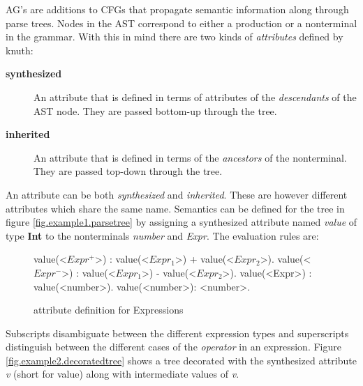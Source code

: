 AG's are additions to CFGs that propagate semantic information along through parse trees. Nodes in the AST correspond to either a production or a nonterminal in the grammar. With this in mind there are two kinds of \emph{attributes} defined by knuth\cite{knuth1}:
\begin{description}
\item[\textbf{synthesized}] An attribute that is defined in terms of attributes of the \emph{descendants} of the AST node. They are passed bottom-up through the tree.
\item[\textbf{inherited}] An attribute that is defined in terms of the \emph{ancestors} of the nonterminal. They are passed top-down through the tree.
\end{description}

An attribute can be both \emph{synthesized} and \emph{inherited}. These are however different attributes which share the same name. Semantics can be defined for the tree in figure \ref{fig.example1.parsetree} by assigning a synthesized attribute named \emph{value} of type \textbf{Int} to the nonterminals \emph{number} and \emph{Expr}. The evaluation rules are:

\begin{figure}[H]
\begin{grammar}
value(<$Expr^+$>) : value(<$Expr_1$>) + value(<$Expr_2$>). 
value(<$Expr^-$>) : value(<$Expr_1$>) - value(<$Expr_2$>). 
value(<Expr>) \hspace{5pt} : value(<number>).
value(<number>): <number>.
\end{grammar}
\caption{attribute definition for Expressions}
\label{semantics:bnf:expr}
\end{figure}

Subscripts disambiguate between the different expression types and superscripts  distinguish between the different cases of the \emph{operator} in an expression. Figure \ref{fig.example2.decoratedtree} shows a tree decorated with the synthesized attribute \emph{v} (short for value) along with intermediate values of \emph{v}.

